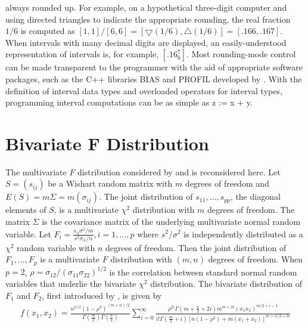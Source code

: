 always rounded up.  For example, on a hypothetical three-digit computer and
using directed triangles to indicate the appropriate rounding, the
real fraction $1/6$ is computed as 
$[1,1]/[6,6] = [\bigtriangledown(1/6) , \bigtriangleup(1/6)] = [.166, .167]$.
When intervals with many decimal digits are displayed, an easily-understood
representation of intervals is, for example, $ [.16_6^7]$.
Most rounding-mode control can be made transparent to the programmer with the
aid of appropriate software packages, such as the C++ libraries BIAS and PROFIL
developed by \cite{KnuppelBIAS,KnuppelPROFIL}.  With the definition of
interval data types and overloaded operators for interval types, programming
interval computations can be as simple as z := x + y.

\section{Bivariate F Distribution}

The multivariate $F$ distribution considered by
\cite{Krishnaiah75} and \cite{Krishnaiah80} is reconsidered here.
Let $S = (s_{ij})$ be a Wishart random matrix with $m$ degrees of 
freedom and 
$E(S) = m\Sigma = m(\sigma_{ij})$.  The joint distribution of
$s_{11},\ldots,s_{pp}$, the diagonal
elements of $S$, is a multivariate $\chi^2$ 
distribution with $m$ degrees of freedom.  The matrix $\Sigma$ is the
covariance matrix of the underlying multivariate normal random variable.
Let $F_i = \frac{s_{ii} \sigma^2/m }{s^2\sigma_{ii}/n}, i = 1,\ldots,p$
where $s^2/\sigma^2$ is independently 
distributed as a $\chi^2$ random variable with $n$ degrees of freedom.
Then the joint distribution of $F_1, \ldots, F_p$ is a multivariate $F$
distribution with $(m,n)$ degrees of freedom.  When $p = 2$, 
$\rho = \sigma_{12}/{(\sigma_{11}\sigma_{22})}^{1/2}$
is the correlation between standard normal random
variables that underlie the bivariate $\chi^2$ distribution.
The bivariate distribution of $F_1$ and $F_2$, 
first introduced by \cite{Krishnaiah65}, is given by 
\begin{eqnarray}
f(x_1, x_2)= \frac{n^{n/2}(1-\rho^2)^{(m+n)/2}}
                  {\Gamma(\frac{m}{2})\Gamma(\frac{n}{2})}
  \sum_{i=0}^\infty 
  \frac{\rho^{2i}\Gamma(m+\frac{n}{2}+2i)m^{m+2i}(x_1 x_2)^{m/2+i-1}}
       {i!\Gamma(\frac{m}{2}+i)[n(1-\rho^2)+m(x_1+x_2)]^{m+n/2+2i}}
\end{eqnarray}

